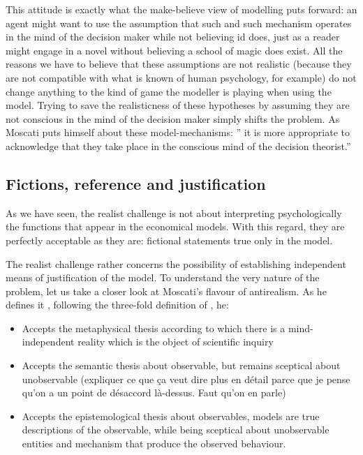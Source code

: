 \documentclass[a4paper,11pt]{article}
\theoremstyle{definition}
\begin{document}
This attitude is exactly what the make-believe view of modelling puts forward: an agent might want to use the assumption that such and such mechanism operates in the mind of the decision maker while not believing id does, just as a reader might engage in a novel without believing a school of magic does exist. All the reasons we have to believe that these assumptions are not realistic (because they are not compatible with what is known of human psychology, for example) do not change anything to the kind of game the modeller is playing when using the model. Trying to save the realisticness of these hypotheses by assuming they are not conscious in the mind of the decision maker simply shifts the problem. As Moscati puts himself about these model-mechanisms: '' it is more appropriate to acknowledge that they take place in the conscious mind of the decision theorist.'' \citep[p.~12]{Moscati2023}


\subsection{Fictions, reference and justification}

As we have seen, the realist challenge is not about interpreting psychologically the functions that appear in the economical models. With this regard, they are perfectly acceptable as they are: fictional statements true only in the model.

The realist challenge rather concerns the possibility of establishing independent means of justification of the model. To understand the very nature of the problem, let us take a closer look at Moscati's flavour of antirealism. As he defines it \citep[pp.~18-20]{Moscati2023}, following the three-fold definition of \citep{Psillos1999}, he:

\begin{itemize}
    \item Accepts the metaphysical thesis according to which there is a mind-independent reality which is the object of scientific inquiry
    \item Accepts the semantic thesis about observable, but remains sceptical about unobservable (expliquer ce que ça veut dire plus en détail parce que je pense qu'on a un point de désaccord là-dessus. Faut qu'on en parle)
    \item Accepts the epistemological thesis about observables, models are true descriptions of the observable, while being sceptical about unobservable entities and mechanism that produce the observed behaviour.
\end{itemize}
\end{document}
